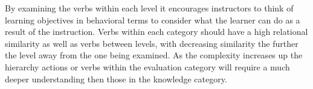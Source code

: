 \noindent
By examining the verbs within each level it encourages instructors to think of learning objectives in behavioral terms to consider what the learner can do as a result of the instruction. \cite{Adams2015} Verbs within each category should have a high relational similarity as well as verbs between levels, with decreasing similarity the further the level away from the one being examined. As the complexity increases up the hierarchy actions or verbs within the evaluation category will require a much deeper understanding then those in the knowledge category.